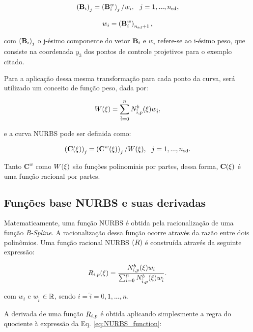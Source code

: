 \documentclass[tese_patricia]{subfiles}
\begin{document}
\begin{align}
	\left(\mathbf{B}_i\right)_j = \left(\mathbf{B}^w_i\right)_j/w_i, \ \ j=1,...,{n_{\mathrm{sd}}} ,
\end{align}

\begin{align}
	w_i =   \left(\mathbf{B}^w_i\right)_{{n_{\mathrm{sd}}}+1},
\end{align}

\noindent com $\left(\mathbf{B}_i\right)_j$ o j-ésimo componente do vetor $\mathbf{B}_i$ e $w_i$ refere-se ao i-ésimo peso, que consiste na coordenada $y_3$ dos pontos de controle projetivos para o exemplo citado.

Para a aplicação dessa mesma transformação para cada ponto da curva, será utilizado um conceito de função peso, dada por:

\begin{align}
	W(\xi) = \sum_{\hat{i}=0}^{n}N^b_{\hat{i},p}(\xi)w_{\hat{i}},
\end{align}

e a curva NURBS pode ser definida como:

\begin{align}
	\left(\mathbf{C}(\xi)\right)_j = \left(\mathbf{C}^w(\xi)\right)_j/W(\xi), \ \ j = 1,...,{n_{\mathrm{sd}}}.
\end{align}

Tanto $\mathbf{C}^w$ como $W(\xi)$ são funções polinomiais por partes, dessa forma, $\mathbf{C}(\xi)$ é uma função racional por partes.

\subsection{Funções base NURBS e suas derivadas}

Matematicamente, uma função NURBS é obtida pela racionalização de uma função \textit{B-Spline}. A racionalização dessa função ocorre através da razão entre dois polinômios. Uma função racional NURBS $\left(R\right)$ é construída através da seguinte expressão:

\begin{align}
R_{i,p}(\xi) = \frac{N^b_{i,p}(\xi)w_i}{\sum_{\hat{i}=0}^{n}N^b_{\hat{i},p}(\xi)w_{\hat{i}}}.  \label{eq:NURBS_function}
\end{align}

\noindent com $w_{i}$ e $w_{\hat{i}}$ $\in \mathbb{R}$, sendo $i = \hat{i} =  0, 1, ... , n$.

A derivada de uma função $R_{i,p}$ é obtida aplicando simplesmente a regra do quociente à expressão da Eq. \ref{eq:NURBS_function}:
\end{document}
